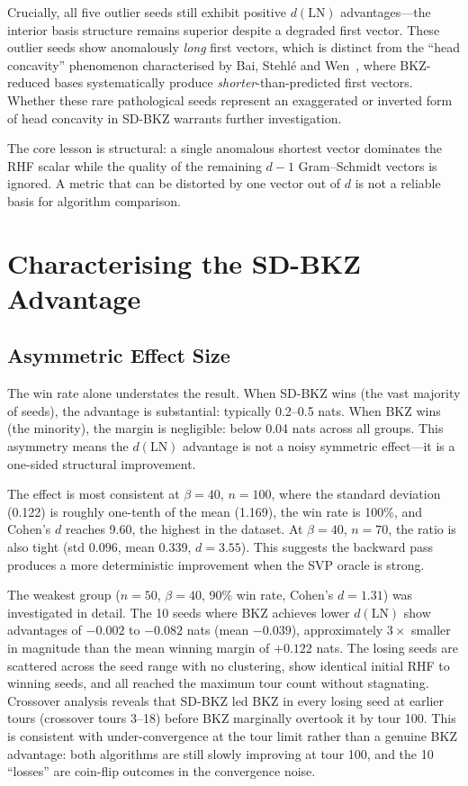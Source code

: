 \documentclass[journal=cic,version=preprint]{iacrj}
\begin{document}
Crucially, all five outlier seeds still exhibit positive $d(\mathrm{LN})$ advantages---the interior basis structure remains superior despite a degraded first vector. These outlier seeds show anomalously \emph{long} first vectors, which is distinct from the ``head concavity'' phenomenon characterised by Bai, Stehl\'{e} and Wen~\cite{AC:BaiSteWen18}, where BKZ-reduced bases systematically produce \emph{shorter}-than-predicted first vectors. Whether these rare pathological seeds represent an exaggerated or inverted form of head concavity in SD-BKZ warrants further investigation.

The core lesson is structural: a single anomalous shortest vector dominates the RHF scalar while the quality of the remaining $d-1$ Gram--Schmidt vectors is ignored. A metric that can be distorted by one vector out of $d$ is not a reliable basis for algorithm comparison.

\section{Characterising the SD-BKZ Advantage}
\label{sec:characterising}

\subsection{Asymmetric Effect Size}

The win rate alone understates the result. When SD-BKZ wins (the vast majority of seeds), the advantage is substantial: typically 0.2--0.5 nats. When BKZ wins (the minority), the margin is negligible: below 0.04 nats across all groups. This asymmetry means the $d(\mathrm{LN})$ advantage is not a noisy symmetric effect---it is a one-sided structural improvement.

The effect is most consistent at $\beta=40$, $n=100$, where the standard deviation (0.122) is roughly one-tenth of the mean (1.169), the win rate is 100\%, and Cohen's $d$ reaches 9.60, the highest in the dataset. At $\beta=40$, $n=70$, the ratio is also tight (std 0.096, mean 0.339, $d=3.55$). This suggests the backward pass produces a more deterministic improvement when the SVP oracle is strong.

The weakest group ($n=50$, $\beta=40$, 90\% win rate, Cohen's $d=1.31$) was investigated in detail. The 10 seeds where BKZ achieves lower $d(\mathrm{LN})$ show advantages of $-0.002$ to $-0.082$ nats (mean $-0.039$), approximately $3\times$ smaller in magnitude than the mean winning margin of $+0.122$ nats. The losing seeds are scattered across the seed range with no clustering, show identical initial RHF to winning seeds, and all reached the maximum tour count without stagnating. Crossover analysis reveals that SD-BKZ led BKZ in every losing seed at earlier tours (crossover tours 3--18) before BKZ marginally overtook it by tour 100. This is consistent with under-convergence at the tour limit rather than a genuine BKZ advantage: both algorithms are still slowly improving at tour 100, and the 10 ``losses'' are coin-flip outcomes in the convergence noise.
\end{document}
